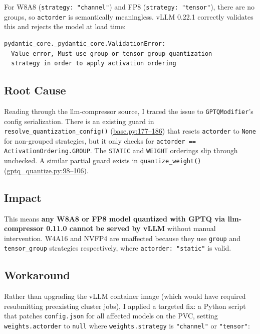 \documentclass[10pt,twocolumn]{article}
\begin{document}
For W8A8 (\texttt{strategy: "channel"}) and FP8 (\texttt{strategy: "tensor"}), there are no groups, so \texttt{actorder} is semantically meaningless. vLLM 0.22.1 correctly validates this and rejects the model at load time:

\begin{lstlisting}
pydantic_core._pydantic_core.ValidationError:
  Value error, Must use group or tensor_group quantization
  strategy in order to apply activation ordering
\end{lstlisting}

\subsection{Root Cause}

Reading through the llm-compressor source, I traced the issue to \texttt{GPTQModifier}'s config serialization. There is an existing guard in \texttt{resolve\_quantization\_config()} (\href{https://github.com/vllm-project/llm-compressor/blob/main/src/llmcompressor/modifiers/gptq/base.py\#L177-L186}{base.py:177--186}) that resets \texttt{actorder} to \texttt{None} for non-grouped strategies, but it only checks for \texttt{actorder == ActivationOrdering.GROUP}. The \texttt{STATIC} and \texttt{WEIGHT} orderings slip through unchecked. A similar partial guard exists in \texttt{quantize\_weight()} (\href{https://github.com/vllm-project/llm-compressor/blob/main/src/llmcompressor/modifiers/gptq/gptq_quantize.py\#L98-L106}{gptq\_quantize.py:98--106}).

\subsection{Impact}

This means \textbf{any W8A8 or FP8 model quantized with GPTQ via llm-compressor 0.11.0 cannot be served by vLLM} without manual intervention. W4A16 and NVFP4 are unaffected because they use \texttt{group} and \texttt{tensor\_group} strategies respectively, where \texttt{actorder: "static"} is valid.

\subsection{Workaround}

Rather than upgrading the vLLM container image (which would have required resubmitting preexisting cluster jobs), I applied a targeted fix: a Python script that patches \texttt{config.json} for all affected models on the PVC, setting \texttt{weights.actorder} to \texttt{null} where \texttt{weights.strategy} is \texttt{"channel"} or \texttt{"tensor"}:
\end{document}
